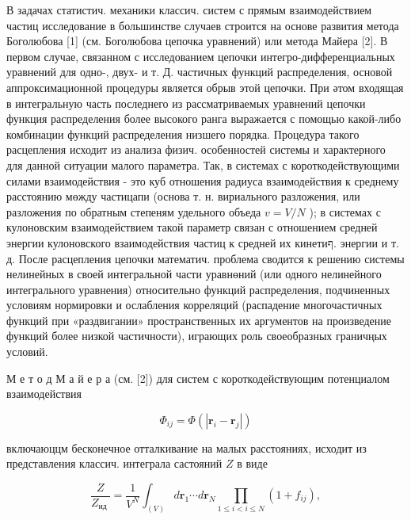 \documentclass[10pt]{article}
\begin{document}
В задачах статистич. механики классич. систем с прямым взаимодействием частиц исследование в большинстве случаев строится на основе развития метода Боголюбова [1] (см. Боголюбова цепочка уравнений) или метода Майера [2]. В первом случае, связанном с исследованием цепочки интегро-дифференциальных уравнений для одно-, двух- и т. Д. частичных функций распределения, основой аппроксимационной процедуры является обрыв этой цепочки. При әтом входящая в интегральную часть последнего из рассматриваемых уравнений цепочки функция распределения более высокого ранга выражается с помощью какой-либо комбинации функций распределения низшего порядка. Процедура такого расцепления исходит из анализа физич. особенностей системы и характерного для данной ситуации малого параметра. Так, в системах с короткодействующими силами взаимодействия - это куб отношения радиуса взаимодействия к среднему расстоянию мөжду частицапи (основа т. н. вириального разложения, или разложения по обратным степеням удельного объеда $v=V / N$ ); в системах с кулоновским взаимодействием такой параметр связан с отношением средней энергии кулоновского взаимодействия частиц к средней их кинетиף. энергии и т. д. После расцепления цепочки математич. проблема сводится к решению системы нелинейных в своей интегральной части уравнөний (или одного нелинейного интегрального уравнения) относительно функций распределения, подчиненных условиям нормировки и ослабления корреляций (распадение многочастичных функций при «раздвигании» пространственных их аргументов на произведение функций более низкой частичности), играющих роль своеобразных граничңых условий.



М е т о д М а й е р а (см. [2]) для систем с короткодействующим потенциалом взаимодействия



\[

\Phi_{i j}=\Phi\left(\left|\boldsymbol{r}_{i}-\boldsymbol{r}_{j}\right|\right)

\]



включаюццм бесконечное отталкивание на малых расстояниях, исходит из представления классич. интеграла састояний $Z$ в виде



\[

\frac{Z}{Z_{\text {ид }}}=\frac{1}{V^{N}} \int_{(V)} d \boldsymbol{r}_{1} \cdots d \boldsymbol{r}_{N} \prod_{1 \leqslant i<i \leqslant N}\left(1+f_{i j}\right),

\]
\end{document}
